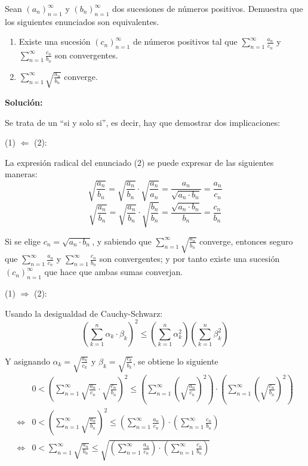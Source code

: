 \documentclass[../../main.tex]{subfiles}
\begin{document}
  \begin{shaded}
    Sean $(a_n)_{n = 1}^\infty$ y $(b_n)_{n = 1}^\infty$ dos sucesiones de números positivos. Demuestra que los siguientes enunciados son equivalentes.

    \begin{enumerate}[(1)]
      \item Existe una sucesión $(c_n)_{n = 1}^\infty$ de números positivos tal que $\displaystyle\sum_{n = 1}^\infty \frac{a_n}{c_n}$ y $\displaystyle\sum_{n = 1}^\infty \frac{c_n}{b_n}$ son convergentes.
      \item $\displaystyle\sum_{n = 1}^\infty \sqrt{\frac{a_n}{b_n}}$ converge.
    \end{enumerate}
  \end{shaded}

  \textbf{Solución:}

  Se trata de un ``si y solo si'', es decir, hay que demostrar dos implicaciones:

  (1) $\Longleftarrow$ (2):

  La expresión radical del enunciado (2) se puede expresar de las siguientes maneras:
  $$
  \sqrt{\frac{a_n}{b_n}} = \sqrt{\frac{a_n}{b_n}} \cdot \sqrt{\frac{a_n}{a_n}} = \frac{a_n}{\sqrt{a_n \cdot b_n}} = \frac{a_n}{c_n}
  $$
  $$
  \sqrt{\frac{a_n}{b_n}} = \sqrt{\frac{a_n}{b_n}} \cdot \sqrt{\frac{b_n}{b_n}} = \frac{\sqrt{a_n \cdot b_n}}{b_n} = \frac{c_n}{b_n}
  $$

  Si se elige $c_n = \sqrt{a_n \cdot b_n}$, y sabiendo que $\displaystyle\sum_{n = 1}^\infty \sqrt{\frac{a_n}{b_n}}$ converge, entonces seguro que $\displaystyle\sum_{n = 1}^\infty \frac{a_n}{c_n}$ y $\displaystyle\sum_{n = 1}^\infty \frac{c_n}{b_n}$ son convergentes; y por tanto existe una sucesión $(c_n)_{n = 1}^\infty$ que hace que ambas sumas converjan.

  (1) $\Longrightarrow$ (2):

  Usando la desigualdad de Cauchy-Schwarz:
  $$
  \left(\sum _{k = 1}^n \alpha_k \cdot \beta_k\right)^2 \leq \left(\sum _{k = 1}^n \alpha_k^2\right)\left(\sum _{k=1}^n \beta_k^2\right)
  $$

  Y asignando $\alpha_k = \displaystyle\sqrt{\frac{a_k}{c_k}}$ y $\beta_k = \displaystyle\sqrt{\frac{c_k}{b_k}}$, se obtiene lo siguiente
  \begin{equation*}
    \begin{split}
      & 0 < \left(\sum_{n = 1}^\infty \sqrt{\frac{a_n}{c_n}} \cdot \sqrt{\frac{c_n}{b_n}}\right)^2 \leq \left(\sum_{n = 1}^\infty \left(\sqrt{\frac{a_n}{c_n}}\right)^2\right)
      \cdot
      \left(\sum_{n = 1}^\infty \left(\sqrt{\frac{c_n}{b_n}}\right)^2\right) \\ \iff &
      0 < \left(\sum_{n = 1}^\infty \sqrt{\frac{a_n}{b_n}}\right)^2 \leq \left(\sum_{n = 1}^\infty \frac{a_n}{c_n}\right)
      \cdot
      \left(\sum_{n = 1}^\infty \frac{c_n}{b_n}\right) \\ \iff &
      0 < \sum_{n = 1}^\infty \sqrt{\frac{a_n}{b_n}} \leq \sqrt{\left(\sum_{n = 1}^\infty \frac{a_n}{c_n}\right)
      \cdot
      \left(\sum_{n = 1}^\infty \frac{c_n}{b_n}\right)}
    \end{split}
  \end{equation*}
\end{document}
